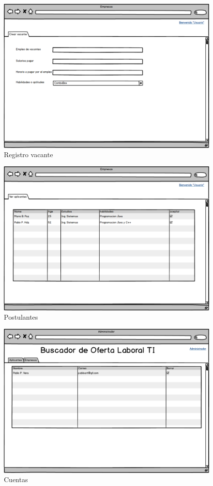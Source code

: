 \begin{figure}[h]
\begin{center}
	\includegraphics[scale=0.55]{./resources/13revacante.png}
	\caption{Registro vacante}
	\label{fig:reca}
\end{center}
\end{figure}

\begin{figure}[h]
\begin{center}
	\includegraphics[scale=0.55]{./resources/14verapicantes.png}
	\caption{Postulantes}
	\label{fig:apli}
\end{center}
\end{figure}

\begin{figure}[h]
\begin{center}
	\includegraphics[scale=0.55]{./resources/15adm.png}
	\caption{Cuentas}
	\label{fig:cue}
\end{center}
\end{figure}
